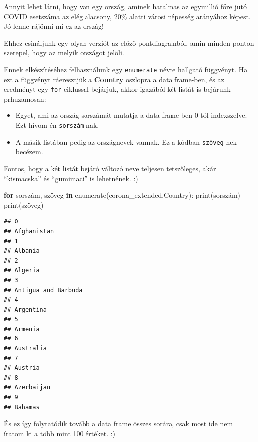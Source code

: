 \documentclass[
]{book}
\newenvironment{Shaded}{\begin{snugshade}}{\end{snugshade}}
\newcommand{\BuiltInTok}[1]{#1}
\newcommand{\ControlFlowTok}[1]{\textcolor[rgb]{0.13,0.29,0.53}{\textbf{#1}}}
\newcommand{\KeywordTok}[1]{\textcolor[rgb]{0.13,0.29,0.53}{\textbf{#1}}}
\newcommand{\NormalTok}[1]{#1}
\providecommand{\tightlist}{%
  \setlength{\itemsep}{0pt}\setlength{\parskip}{0pt}}
\begin{document}
Annyit lehet látni, hogy van egy ország, aminek hatalmas az egymillió főre jutó COVID esetszáma az elég alacsony, \(20\%\) alatti városi népesség arányához képest. Jó lenne rájönni mi ez az ország!

Ehhez csináljunk egy olyan verziót az előző pontdiagramból, amin minden ponton szerepel, hogy az melyik országot jelöli.

Ennek elkészítéséhez felhasználunk egy \texttt{enumerate} névre hallgató függvényt. Ha ezt a függvényt ráeresztjük a \textbf{Country} oszlopra a data frame-ben, és az eredményt egy \texttt{for} ciklussal bejárjuk, akkor igazából két listát is bejárunk prhuzamosan:

\begin{itemize}
\tightlist
\item
  Egyet, ami az ország sorszámát mutatja a data frame-ben \(0\)-tól indexszelve. Ezt hívom én \texttt{sorszám}-nak.
\item
  A másik listában pedig az országnevek vannak. Ez a kódban \texttt{szöveg}-nek becézem.
\end{itemize}

Fontos, hogy a két listát bejáró változó neve teljesen tetszőleges, akár ``kismacska'' és ``gumimaci'' is lehetnének. :)

\begin{Shaded}
\begin{Highlighting}[]
\ControlFlowTok{for}\NormalTok{ sorszám, szöveg }\KeywordTok{in} \BuiltInTok{enumerate}\NormalTok{(corona\_extended.Country):}
   \BuiltInTok{print}\NormalTok{(sorszám)}
   \BuiltInTok{print}\NormalTok{(szöveg)}
\end{Highlighting}
\end{Shaded}

\begin{verbatim}
## 0
## Afghanistan
## 1
## Albania
## 2
## Algeria
## 3
## Antigua and Barbuda
## 4
## Argentina
## 5
## Armenia
## 6
## Australia
## 7
## Austria
## 8
## Azerbaijan
## 9
## Bahamas
\end{verbatim}

És ez így folytatódik tovább a data frame összes sorára, csak most ide nem íratom ki a több mint 100 értéket. :)
\end{document}

